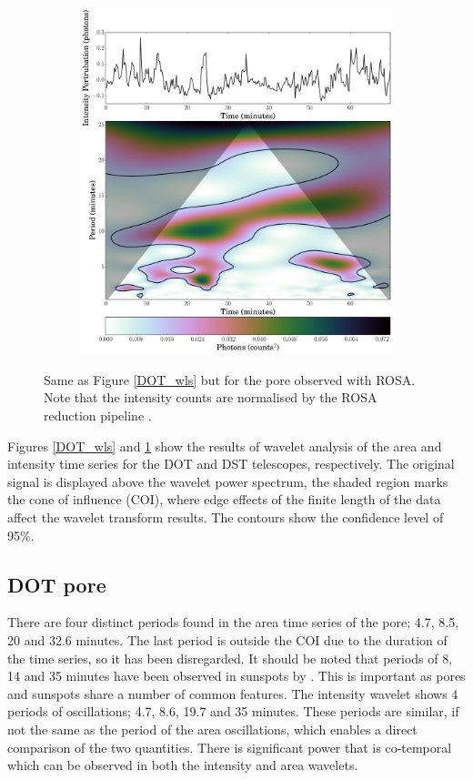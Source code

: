 \begin{figure}
\begin{subfigure}[b]{0.45\textwidth}
            \includegraphics[width=\textwidth]{rosa_inten.pdf}
        \end{subfigure}
        \caption{Same as Figure \ref{DOT_wls} but for the pore observed with ROSA. Note that the intensity counts are normalised by the ROSA reduction pipeline \citep{jess1}.}
        \label{ROSA_wls}
    \end{figure}
    
    Figures \ref{DOT_wls} and \ref{ROSA_wls} show the results of wavelet analysis of the area and intensity time series for the DOT and DST telescopes, respectively.
    The original signal is displayed above the wavelet power spectrum, the shaded region marks the cone of influence (COI), where edge effects of the finite length of the data affect the wavelet transform results.
    The contours show the confidence level of 95\%. 
    
    \subsection{DOT pore}
    
    There are four distinct periods found in the area time series of the pore; 4.7, 8.5, 20 and 32.6 minutes.
    The last period is outside the COI due to the duration of the time series, so it has been disregarded.
    It should be noted that periods of 8, 14 and 35 minutes have been observed in sunspots by \citet{kobanov}.
    This is important as pores and sunspots share a number of common features.
    The intensity wavelet shows 4 periods of oscillations; 4.7, 8.6, 19.7 and 35 minutes.
    These periods are similar, if not the same as the period of the area oscillations, which enables a direct comparison of the two quantities. 
    There is significant power that is co-temporal which can be observed in both the intensity and area wavelets.
    
